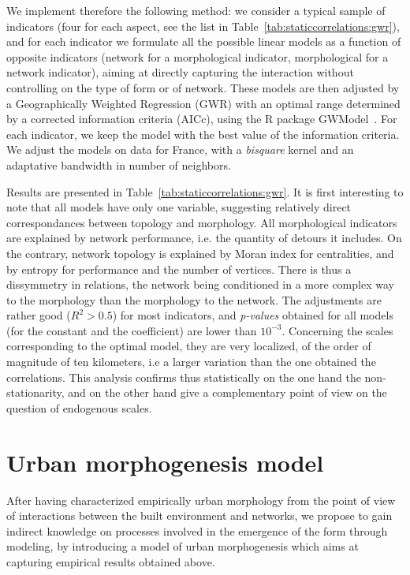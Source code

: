 We implement therefore the following method: we consider a typical sample of indicators (four for each aspect, see the list in Table~\ref{tab:staticcorrelations:gwr}), and for each indicator we formulate all the possible linear models as a function of opposite indicators (network for a morphological indicator, morphological for a network indicator), aiming at directly capturing the interaction without controlling on the type of form or of network. These models are then adjusted by a Geographically Weighted Regression (GWR) with an optimal range determined by a corrected information criteria (AICc), using the R package GWModel~\citep{gollini2013gwmodel}. For each indicator, we keep the model with the best value of the information criteria. We adjust the models on data for France, with a \emph{bisquare} kernel and an adaptative bandwidth in number of neighbors.


Results are presented in Table~\ref{tab:staticcorrelations:gwr}. It is first interesting to note that all models have only one variable, suggesting relatively direct correspondances between topology and morphology. All morphological indicators are explained by network performance, i.e. the quantity of detours it includes. On the contrary, network topology is explained by Moran index for centralities, and by entropy for performance and the number of vertices. There is thus a dissymmetry in relations, the network being conditioned in a more complex way to the morphology than the morphology to the network. The adjustments are rather good ($R^2 > 0.5$) for most indicators, and \emph{p-values} obtained for all models (for the constant and the coefficient) are lower than $10^{-3}$. Concerning the scales corresponding to the optimal model, they are very localized, of the order of magnitude of ten kilometers, i.e a larger variation than the one obtained the correlations. This analysis confirms thus statistically on the one hand the non-stationarity, and on the other hand give a complementary point of view on the question of endogenous scales.









\section{Urban morphogenesis model}

After having characterized empirically urban morphology from the point of view of interactions between the built environment and networks, we propose to gain indirect knowledge on processes involved in the emergence of the form through modeling, by introducing a model of urban morphogenesis which aims at capturing empirical results obtained above.

